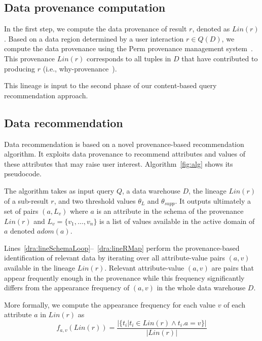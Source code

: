\subsection{Data provenance computation }
In the first step, we compute the data provenance of result $r$, denoted as $Lin(r)$.
Based on a data region determined by a user interaction $r \in Q(D)$,
we compute the data provenance using the Perm provenance management system~\cite{Glavic:09}. This provenance $Lin(r)$ corresponds to all tuples in $D$ that have contributed to producing $r$ (i.e., why-provenance~\cite{cheney:book09}).  

This lineage is input to the second phase of our content-based query recommendation approach.

 \subsection{Data recommendation }
 \label{subsec:data-rec}
Data recommendation is based on a novel provenance-based recommendation algorithm. 
It exploits data provenance to recommend attributes and values of these attributes that may raise user interest. Algorithm~\ref{fig:alg} shows its pseudocode.


 

The algorithm takes as input query $Q$, a data warehouse $D$, the lineage $Lin(r)$ of a sub-result  $r$, and two threshold values $\theta_{L}$ and $\theta_{supp}$.
It outputs ultimately a set of pairs $(a, L_v)$ where $a$ is an attribute in the schema of the provenance $Lin(r)$ and $L_v = \{v_1, \ldots, v_n\}$ is a list of values available in the active domain of $a$ denoted $adom(a)$.




Lines~\ref{dra:lineSchemaLoop}--~\ref{dra:lineRMap} perform the provenance-based identification of relevant data by iterating over all attribute-value pairs $(a, v)$ available in the lineage $Lin(r)$.
Relevant attribute-value $(a, v)$ are pairs that appear frequently enough in the provenance while this frequency significantly differs from the appearance frequency of $(a,v)$ in the whole data warehouse $D$.

More formally, we compute the appearance frequency for each value $v$ of each attribute $a$ in $Lin(r)$ as
\begin{equation}
f_{a,v}(Lin(r)) =  \frac{ | \{t_i | t_i \in Lin(r) \wedge t_i.a = v \} | }{| Lin(r) |}
\label{eq:f-lin}
\end{equation}
 
